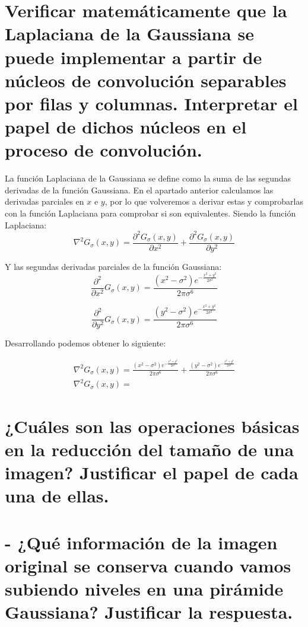 \documentclass{article}
\begin{document}
\section{Verificar matemáticamente que la Laplaciana de la Gaussiana se puede implementar a partir de núcleos de convolución separables por filas y columnas. Interpretar el papel de dichos núcleos en el proceso de convolución. }

La función Laplaciana de la Gaussiana se define como la suma de las segundas derivadas de la función Gaussiana. En el apartado anterior calculamos las derivadas parciales en $x$ e $y$, por lo que volveremos a derivar estas y comprobarlas con la función Laplaciana para comprobar si son equivalentes.
Siendo la función Laplaciana:
\begin{equation}
\nabla^2 G_{\sigma}(x,y) = \frac{\partial^2 G_{\sigma}(x,y)}{\partial x^2} + \frac{\partial^2 G_{\sigma}(x,y)}{\partial y^2}
\end{equation}


Y las segundas derivadas parciales de la función Gaussiana:
\begin{equation}
\frac{\partial^2}{\partial x^2} G_{\sigma}(x,y) = \frac{(x^2-\sigma^2)e^{-\frac{x^2+y^2}{2\sigma^2}}}{2\pi\sigma^6}
\end{equation}

\begin{equation}
\frac{\partial^2}{\partial y^2} G_{\sigma}(x,y) = \frac{(y^2-\sigma^2)e^{-\frac{x^2+y^2}{2\sigma^2}}}{2\pi\sigma^6}
\end{equation}

Desarrollando podemos obtener lo siguiente:

\begin{align*}
\nabla^2 G_{\sigma}(x,y) = \frac{(x^2-\sigma^2)e^{-\frac{x^2+y^2}{2\sigma^2}}}{2\pi\sigma^6} + \frac{(y^2-\sigma^2)e^{-\frac{x^2+y^2}{2\sigma^2}}}{2\pi\sigma^6}
\\
\nabla^2 G_{\sigma}(x,y) =
\end{align*}

\section{¿Cuáles son las operaciones básicas en la reducción del tamaño de una imagen? Justificar el papel de cada una de ellas. }



\section{- ¿Qué información de la imagen original se conserva cuando vamos subiendo niveles en una pirámide Gaussiana? Justificar la respuesta. }
\end{document}
